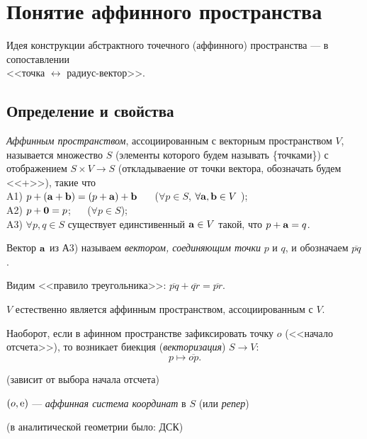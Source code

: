 

\section{Понятие аффинного пространства}

Идея конструкции абстрактного точечного (аффинного) пространства
---  в сопоставлении \\
<<точка $\leftrightarrow$ радиус-вектор>>.


\subsection{Определение и свойства}



{\it Аффинным пространством}, ассоциированным с векторным пространством $V$, называется множество $S$
(элементы которого будем называть \{точками\})  с отображением $S\times V\to S$ (откладываение от точки вектора, 
обозначать будем <<+>>), такие что\\
A1)  $p+(\mathbf{a}+\mathbf{b}) = (p+\mathbf{a})+\mathbf{b} $ \,\,\,\,\,\, ($\forall p\in S$, $\forall \mathbf{a}, \mathbf{b} \in V$ );\\
A2)  $p+\mathbf{0} = p$; \,\,\,\,\,\, ($\forall p\in S$);\\
A3)  $\forall p, q\in S$  существует единстивенный $\mathbf{a}\in V$ такой, что $p+ \mathbf{a} = q$.\\

\otstup

Вектор $\mathbf{a}$ из А3) называем {\it вектором, соединяющим точки} $p$ и $q$, и обозначаем $\overline{pq}$.

\otstup

Видим <<правило треугольника>>: $\overline{pq}+\overline{qr}=\overline{pr}$.

\otstup

$V$ естественно является аффинным пространством, ассоциированным с $V$.

\otstup

Наоборот, если в афинном пространстве зафиксировать точку $o$ (<<начало отсчета>>), 
то возникает биекция ({\it векторизация})  $S\to V$:
$$p \mapsto \overline{op}.$$ 

(зависит от выбора начала отсчета)

\otstup

$(o, \mathrm{e}) $ --- {\it аффинная система координат} в $S$ (или {\it репер})

(в аналитической геометрии было: ДСК)

